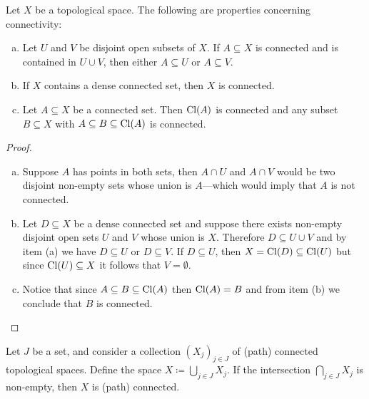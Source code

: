 \begin{proposition}
    \label{prop:properties-connectivity}
    Let \(X\) be a topological space. The following are properties concerning
    connectivity:
    \begin{enumerate}[(a)]\setlength\itemsep{0em}
        \item Let \(U\) and \(V\) be disjoint open subsets of \(X\). If
              \(A \subseteq X\) is connected and is contained in \(U \cup V\), then either
              \(A \subseteq U\) or \(A \subseteq V\).

        \item If \(X\) contains a dense connected set, then \(X\) is connected.

        \item Let \(A \subseteq X\) be a connected set. Then \(\operatorname{Cl}(A)\) is connected and
              any subset \(B \subseteq X\) with \(A \subseteq B \subseteq \operatorname{Cl}(A)\) is
              connected.
    \end{enumerate}
\end{proposition}

\begin{proof}
    \begin{enumerate}[(a)]\setlength\itemsep{0em}
        \item Suppose \(A\) has points in both sets, then \(A \cap U\) and \(A \cap V\)
              would be two disjoint non-empty sets whose union is \(A\)---which would
              imply that \(A\) is not connected.

        \item Let \(D \subseteq X\) be a dense connected set and suppose there exists
              non-empty disjoint open sets \(U\) and \(V\) whose union is \(X\). Therefore
              \(D \subseteq U \cup V\) and by item (a) we have \(D \subseteq U\) or \(D
              \subseteq V\). If \(D \subseteq U\), then \(X = \operatorname{Cl}(D) \subseteq \operatorname{Cl}(U)\) but
              since \(\operatorname{Cl}(U) \subseteq X\) it follows that \(V = \emptyset\).

        \item Notice that since \(A \subseteq B \subseteq \operatorname{Cl}(A)\) then \(\operatorname{Cl}(A) = B\)
              and from item (b) we conclude that \(B\) is connected.
    \end{enumerate}
\end{proof}

\begin{proposition}
    \label{prop:union-path-connected}
    Let \(J\) be a set, and consider a collection \((X_j)_{j \in J}\) of (path)
    connected topological spaces. Define the space
    \(X \coloneq \bigcup_{j \in J} X_j\). If the intersection
    \(\bigcap_{j \in J} X_j\) is non-empty, then \(X\) is (path) connected.
\end{proposition}

